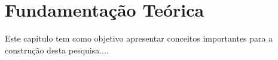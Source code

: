 \chapter{Fundamentação Teórica}

Este capítulo tem como objetivo apresentar conceitos importantes para a
construção desta pesquisa....
